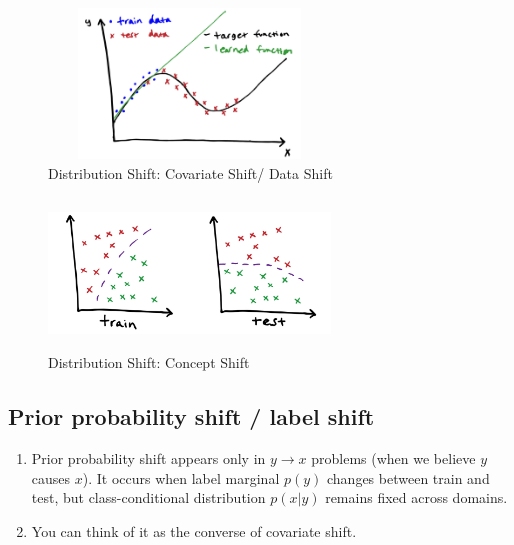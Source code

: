 \begin{table}[H]
    \begin{minipage}{0.45\textwidth}
        \begin{figure}[H]
            \centering
            \includegraphics[width=7.5cm,height=4cm]{Pictures/ml-data/ml-data-covariate-shift.jpg}
            \caption{Distribution Shift: Covariate Shift/ Data Shift}
        \end{figure}
    \end{minipage}
    \hfill
    \begin{minipage}{0.45\textwidth}
        \begin{figure}[H]
            \centering
            \includegraphics[width=7.5cm,height=4cm]{Pictures/ml-data/ml-data-concept-shift.jpg}
            \caption{Distribution Shift: Concept Shift}
        \end{figure}
    \end{minipage}
\end{table}




\subsection{Prior probability shift / label shift \cite{dnn-1,mit-imbalance-outliers-shift}} \label{Prior probability shift / label shift}
\begin{enumerate}
    \item Prior probability shift appears only in $y \to x$ problems (when we believe $y$ causes $x$). It occurs when label marginal $p(y)$ changes between train and test, but class-conditional distribution $p(x|y)$ remains fixed across domains. 
    
    \item You can think of it as the converse of covariate shift.
\end{enumerate}



